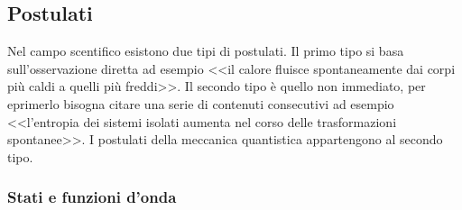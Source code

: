 \subsection{Postulati}
Nel campo scentifico esistono due tipi di postulati. Il primo tipo si basa sull'osservazione diretta ad esempio <<il calore fluisce spontaneamente dai corpi più caldi a quelli più freddi>>. Il secondo tipo è quello non immediato, per eprimerlo bisogna citare una serie di contenuti consecutivi ad esempio <<l'entropia dei sistemi isolati aumenta nel corso delle trasformazioni spontanee>>. I postulati della meccanica quantistica appartengono al secondo tipo.

\subsubsection{Stati e funzioni d'onda}

